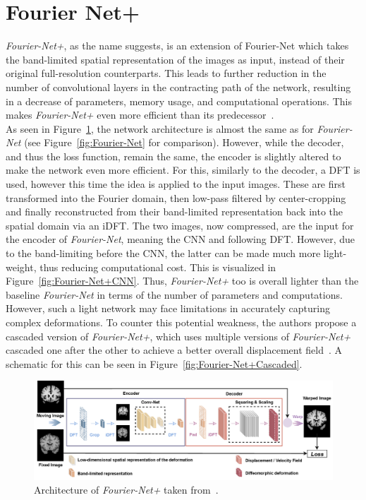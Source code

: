 \documentclass[english,version-2022-01]{uzl-thesis} %
\begin{document}
\section{Fourier Net+} \label{Sec:Fourier-Net+}
\emph{Fourier-Net+}, as the name suggests, is an extension of Fourier-Net which takes the band-limited spatial representation of the images as input, instead of their original full-resolution counterparts. This leads to further reduction in the number of convolutional layers in the contracting path of the network, resulting in a decrease of parameters, memory usage, and computational operations. This makes \emph{Fourier-Net+} even more efficient than its predecessor~\cite{Fourier-Net+}.\\
As seen in Figure~\ref{fig:Fourier-Net+}, the network architecture is almost the same as for \emph{Fourier-Net} (see Figure~\ref{fig:Fourier-Net} for comparison). However, while the decoder, and thus the loss function, remain the same, the encoder is slightly altered to make the network even more efficient. For this, similarly to the decoder, a DFT is used, however this time the idea is applied to the input images. These are first transformed into the Fourier domain, then low-pass filtered by center-cropping and finally reconstructed from their band-limited representation back into the spatial domain via an iDFT. The two images, now compressed, are the input for the encoder of \emph{Fourier-Net}, meaning the CNN and following DFT. However, due to the band-limiting before the CNN, the latter can be made much more light-weight, thus reducing computational cost. This is visualized in Figure~\ref{fig:Fourier-Net+CNN}. Thus, \emph{Fourier-Net+} too is overall lighter than the baseline \emph{Fourier-Net} in terms of the number of parameters and computations. However, such a light network may face limitations in accurately capturing complex deformations. To counter this potential weakness, the authors propose a cascaded version of \emph{Fourier-Net+}, which uses multiple versions of \emph{Fourier-Net+} cascaded one after the other to achieve a better overall displacement field~\cite{Fourier-Net+}. A schematic for this can be seen in Figure~\ref{fig:Fourier-Net+Cascaded}.

\begin{figure}[htpb]
	\centering
	\graphicspath{{images/}{\main/images/}}
	\includegraphics[width=\linewidth]{ArchitectureFourier-Net+.png} 
	\caption{Architecture of \emph{Fourier-Net+} taken from~\cite{Fourier-Net+}.}
	\label{fig:Fourier-Net+}
\end{figure}
\end{document}
